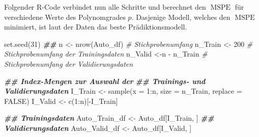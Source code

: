 \documentclass[
  ngerman,
]{book}
\newenvironment{Shaded}{\begin{snugshade}}{\end{snugshade}}
\newcommand{\AttributeTok}[1]{\textcolor[rgb]{0.77,0.63,0.00}{#1}}
\newcommand{\CommentTok}[1]{\textcolor[rgb]{0.56,0.35,0.01}{\textit{#1}}}
\newcommand{\ConstantTok}[1]{\textcolor[rgb]{0.00,0.00,0.00}{#1}}
\newcommand{\DecValTok}[1]{\textcolor[rgb]{0.00,0.00,0.81}{#1}}
\newcommand{\DocumentationTok}[1]{\textcolor[rgb]{0.56,0.35,0.01}{\textbf{\textit{#1}}}}
\newcommand{\FunctionTok}[1]{\textcolor[rgb]{0.00,0.00,0.00}{#1}}
\newcommand{\NormalTok}[1]{#1}
\newcommand{\OtherTok}[1]{\textcolor[rgb]{0.56,0.35,0.01}{#1}}
\newcommand{\SpecialCharTok}[1]{\textcolor[rgb]{0.00,0.00,0.00}{#1}}
\begin{document}
Folgender R-Code verbindet nun alle Schritte und berechnet den \(\operatorname{MSPE}\) für verschiedene Werte des Polynomgrades \(p\). Dasjenige Modell, welches den \(\operatorname{MSPE}\) minimiert, ist laut der Daten das beste Prädiktionsmodell.

\begin{Shaded}
\begin{Highlighting}[]
\FunctionTok{set.seed}\NormalTok{(}\DecValTok{31}\NormalTok{)}
\DocumentationTok{\#\#}
\NormalTok{n        }\OtherTok{\textless{}{-}} \FunctionTok{nrow}\NormalTok{(Auto\_df) }\CommentTok{\# Stichprobenumfang}
\NormalTok{n\_Train  }\OtherTok{\textless{}{-}} \DecValTok{200}           \CommentTok{\# Stichprobenumfang der Trainingsdaten}
\NormalTok{n\_Valid  }\OtherTok{\textless{}{-}}\NormalTok{n }\SpecialCharTok{{-}}\NormalTok{ n\_Train    }\CommentTok{\# Stichprobenumfang der Validierungsdaten}

\DocumentationTok{\#\# Index{-}Mengen zur Auswahl der }
\DocumentationTok{\#\# Trainings{-} und Validierungsdaten}
\NormalTok{I\_Train  }\OtherTok{\textless{}{-}} \FunctionTok{sample}\NormalTok{(}\AttributeTok{x =} \DecValTok{1}\SpecialCharTok{:}\NormalTok{n, }\AttributeTok{size =}\NormalTok{ n\_Train, }\AttributeTok{replace =} \ConstantTok{FALSE}\NormalTok{)}
\NormalTok{I\_Valid  }\OtherTok{\textless{}{-}} \FunctionTok{c}\NormalTok{(}\DecValTok{1}\SpecialCharTok{:}\NormalTok{n)[}\SpecialCharTok{{-}}\NormalTok{I\_Train]}

\DocumentationTok{\#\# Trainingsdaten }
\NormalTok{Auto\_Train\_df }\OtherTok{\textless{}{-}}\NormalTok{ Auto\_df[I\_Train, ]}
\DocumentationTok{\#\# Validierungsdaten }
\NormalTok{Auto\_Valid\_df }\OtherTok{\textless{}{-}}\NormalTok{ Auto\_df[I\_Valid, ]}


\end{Highlighting}
\end{Shaded}
\end{document}
